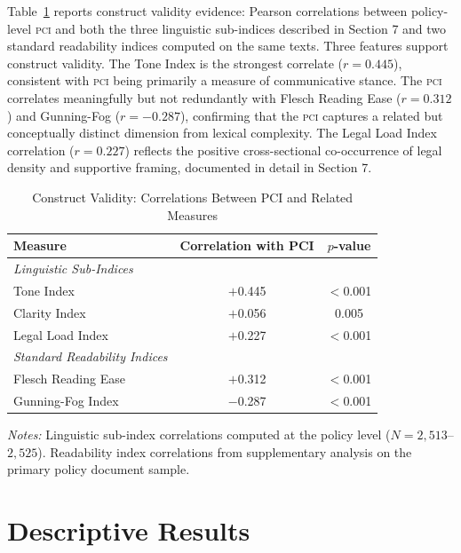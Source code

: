 \documentclass[12pt]{article}
\newcommand{\PCI}{\textsc{pci}}
\begin{document}
Table~\ref{tab:construct} reports construct validity evidence: Pearson correlations
between policy-level \PCI{} and both the three linguistic sub-indices described in
Section 7 and two standard readability indices computed on the same texts.  Three
features support construct validity.  The Tone Index is the strongest correlate
($r = 0.445$), consistent with \PCI{} being primarily a measure of communicative
stance.  The \PCI{} correlates meaningfully but not redundantly with Flesch Reading
Ease ($r = 0.312$) and Gunning-Fog ($r = -0.287$), confirming that the \PCI{}
captures a related but conceptually distinct dimension from lexical complexity.
The Legal Load Index correlation ($r = 0.227$) reflects the positive cross-sectional
co-occurrence of legal density and supportive framing, documented in detail in
Section 7.

\begin{table}[H]
\centering
\caption{Construct Validity: Correlations Between PCI and Related Measures}
\label{tab:construct}
\begin{threeparttable}
\small
\begin{tabular}{lcc}
\toprule
\textbf{Measure} & \textbf{Correlation with PCI} & \textbf{$p$-value} \\
\midrule
\textit{Linguistic Sub-Indices} & & \\
\quad Tone Index       & $+$0.445 & $<$0.001 \\
\quad Clarity Index    & $+$0.056 & 0.005 \\
\quad Legal Load Index & $+$0.227 & $<$0.001 \\
\addlinespace
\textit{Standard Readability Indices} & & \\
\quad Flesch Reading Ease & $+$0.312 & $<$0.001 \\
\quad Gunning-Fog Index   & $-$0.287 & $<$0.001 \\
\bottomrule
\end{tabular}
\begin{tablenotes}
\small
\item \textit{Notes:} Linguistic sub-index correlations computed at the policy level
  ($N = 2{,}513$--$2{,}525$).  Readability index correlations from supplementary
  analysis on the primary policy document sample.
\end{tablenotes}
\end{threeparttable}
\end{table}

\section{Descriptive Results}
\end{document}
